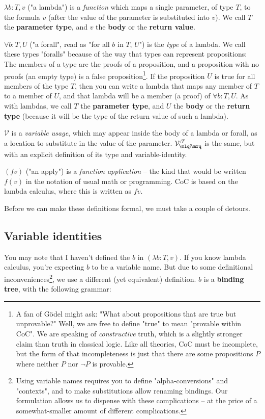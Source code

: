 \documentclass{article}
\newcommand{\usage}{\mathcal{V}}
\newcommand{\usageKnown}[2]{{\usage_{\mlq\hspace{-0.06em}#2\hspace{-0.06em}\mrq}^{:#1}}}
\begin{document}
  $\lambda b:T,v$ ("a lambda") is a \emph{function} which maps a single parameter, of type $T$, to the formula $v$ (after the value of the parameter is substituted into $v$). We call $T$ the \textbf{parameter type}, and $v$ the \textbf{body} or the \textbf{return value}.
  
  $\forall b:T,U$ ("a forall", read as "for all $b$ in $T$, $U$") is the \emph{type} of a lambda. We call these types "foralls" because of the way that types can represent propositions: The members of a type are the proofs of a proposition, and a proposition with no proofs (an empty type) is a false proposition\footnote{A fan of Gödel might ask: "What about propositions that are true but unprovable?" Well, we are free to define "true" to mean "provable within CoC". We are speaking of \emph{constructive} truth, which is a slightly stronger claim than truth in classical logic. Like all theories, CoC must be incomplete, but the form of that incompleteness is just that there are some propositions $P$ where neither $P$ nor $\neg P$ is provable.}. If the proposition $U$ is true for all members of the type $T$, then you can write a lambda that maps any member of $T$ to a member of $U$, and that lambda will be a member (a proof) of $\forall b:T,U$. As with lambdas, we call $T$ the \textbf{parameter type}, and $U$ the \textbf{body} or the \textbf{return type} (because it will be the type of the return value of such a lambda).
  
  $\usage$ is a \emph{variable usage}, which may appear inside the body of a lambda or forall, as a location to substitute in the value of the parameter. $\usageKnown{T}{i}$ is the same, but with an explicit definition of its type and variable-identity.
  
  $(f v)$ ("an apply") is a \emph{function application} – the kind that would be written $f(v)$ in the notation of usual math or programming. CoC is based on the lambda calculus, where this is written as $f v$.
  
  Before we can make these definitions formal, we must take a couple of detours.
  
  

  \subsection{Variable identities}

  You may note that I haven't defined the $b$ in $(\lambda b:T,v)$. If you know lambda calculus, you're expecting $b$ to be a variable name. But due to some definitional inconveniences\footnote{Using variable names requires you to define "alpha-conversions" and "contexts", and to make substitutions allow renaming bindings. Our formulation allows us to dispense with these complications – at the price of a somewhat-smaller amount of different complications.}, we use a different (yet equivalent) definition. $b$ is a \textbf{binding tree}, with the following grammar:
\end{document}

